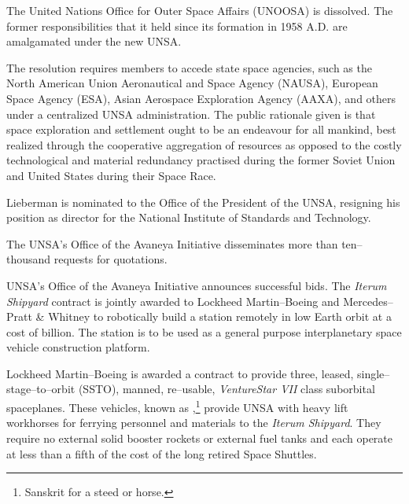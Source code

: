 The United Nations Office for Outer Space Affairs (UNOOSA) is dissolved. The former responsibilities that it held since its formation in 1958 A.D. are amalgamated under the new UNSA.

The resolution requires members to accede state space agencies, such as the North American Union Aeronautical and Space Agency (NAUSA), European Space Agency (ESA), Asian Aerospace Exploration Agency (AAXA), and others under a centralized UNSA administration. The public rationale given is that space exploration and settlement ought to be an endeavour for all mankind, best realized through the cooperative aggregation of resources as opposed to the costly technological and material redundancy practised during the former Soviet Union and United States during their Space Race.

Lieberman is nominated to the Office of the President of the UNSA, resigning his position as director for the National Institute of Standards and Technology.
\StopTimelineDate

The UNSA's Office of the Avaneya Initiative disseminates more than ten--thousand requests for quotations.
\StopTimelineDate

UNSA's Office of the Avaneya Initiative announces successful bids. The {\it Iterum Shipyard} contract is jointly awarded to Lockheed Martin--Boeing and Mercedes--Pratt & Whitney to robotically build a station remotely in low Earth orbit at a cost of  billion. The station is to be used as a general purpose interplanetary space vehicle construction platform.


Lockheed Martin--Boeing is awarded a contract to provide three, leased, single--stage--to--orbit (SSTO), manned, re--usable, {\it VentureStar VII} class suborbital spaceplanes. These vehicles, known as ,\footnote{Sanskrit  for a steed or horse.} provide UNSA with heavy lift workhorses for ferrying personnel and materials to the {\it Iterum Shipyard}. They require no external solid booster rockets or external fuel tanks and each operate at less than a fifth of the cost of the long retired Space Shuttles.

